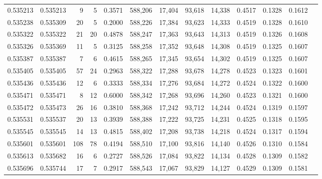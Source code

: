 \begin{tabular}{rrrrrrrrrrrrr}
0.535213 & 0.535213 &     9 &     5 &                                     0.3571 & 588,206 &  17,404 &  93,618 &  14,338 & 0.4517 & 0.1328 & 0.1612 \\
0.535238 & 0.535309 &    20 &     5 &                                     0.2000 & 588,226 &  17,384 &  93,623 &  14,333 & 0.4519 & 0.1328 & 0.1610 \\
0.535322 & 0.535322 &    21 &    20 &                                     0.4878 & 588,247 &  17,363 &  93,643 &  14,313 & 0.4519 & 0.1326 & 0.1608 \\
0.535326 & 0.535369 &    11 &     5 &                                     0.3125 & 588,258 &  17,352 &  93,648 &  14,308 & 0.4519 & 0.1325 & 0.1607 \\
0.535387 & 0.535387 &     7 &     6 &                                     0.4615 & 588,265 &  17,345 &  93,654 &  14,302 & 0.4519 & 0.1325 & 0.1607 \\
0.535405 & 0.535405 &    57 &    24 &                                     0.2963 & 588,322 &  17,288 &  93,678 &  14,278 & 0.4523 & 0.1323 & 0.1601 \\
0.535436 & 0.535436 &    12 &     6 &                                     0.3333 & 588,334 &  17,276 &  93,684 &  14,272 & 0.4524 & 0.1322 & 0.1600 \\
0.535471 & 0.535471 &     8 &    12 &                                     0.6000 & 588,342 &  17,268 &  93,696 &  14,260 & 0.4523 & 0.1321 & 0.1600 \\
0.535472 & 0.535473 &    26 &    16 &                                     0.3810 & 588,368 &  17,242 &  93,712 &  14,244 & 0.4524 & 0.1319 & 0.1597 \\
0.535531 & 0.535537 &    20 &    13 &                                     0.3939 & 588,388 &  17,222 &  93,725 &  14,231 & 0.4525 & 0.1318 & 0.1595 \\
0.535545 & 0.535545 &    14 &    13 &                                     0.4815 & 588,402 &  17,208 &  93,738 &  14,218 & 0.4524 & 0.1317 & 0.1594 \\
0.535601 & 0.535601 &   108 &    78 &                                     0.4194 & 588,510 &  17,100 &  93,816 &  14,140 & 0.4526 & 0.1310 & 0.1584 \\
0.535613 & 0.535682 &    16 &     6 &                                     0.2727 & 588,526 &  17,084 &  93,822 &  14,134 & 0.4528 & 0.1309 & 0.1582 \\
0.535696 & 0.535744 &    17 &     7 &                                     0.2917 & 588,543 &  17,067 &  93,829 &  14,127 & 0.4529 & 0.1309 & 0.1581 \\

\end{tabular}
